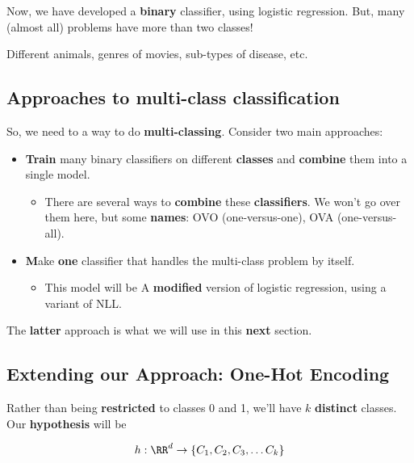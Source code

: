     Now, we have developed a \textbf{binary} classifier, using logistic regression. But, many (almost all) problems have more than two classes! 
    
    \miniex Different animals, genres of movies, sub-types of disease, etc.
    
    \subsection{Approaches to multi-class classification}
        
        So, we need to a way to do \textbf{multi-classing}. Consider two main approaches:
        
        \begin{itemize}
            \item \textbf{Train} many binary classifiers on different \textbf{classes} and \textbf{combine} them into a single model.
                \begin{itemize}
                    \item There are several ways to \textbf{combine} these \textbf{classifiers}. We won't go over them here, but some \textbf{names}: OVO (one-versus-one), OVA (one-versus-all).
                \end{itemize}
                
            \item \textbf Make \textbf{one} classifier that handles the multi-class problem by itself. 
                \begin{itemize}
                    \item This model will be A \textbf{modified} version of logistic regression, using a variant of NLL.
                \end{itemize}
    \end{itemize}
    
    The \textbf{latter} approach is what we will use in this \textbf{next} section.
    
    \subsection{Extending our Approach: One-Hot Encoding}
    
        Rather than being \textbf{restricted} to classes 0 and 1, we'll have $k$ \textbf{distinct} classes. Our \textbf{hypothesis} will be
        
        \begin{equation*}
            h: \RR^d \rightarrow \{C_1, C_2, C_3, \dots C_k\}
        \end{equation*}
        
